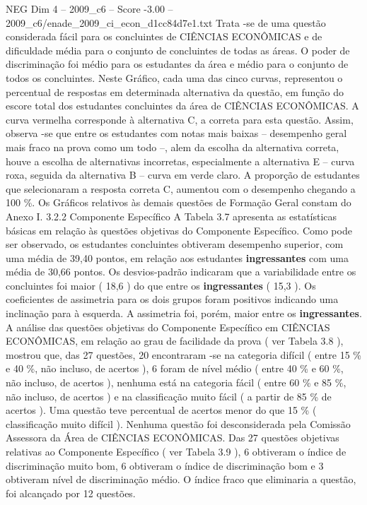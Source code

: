 \begin{textsample}{NEG Dim 4 – 2009\_c6 – Score -3.00 – 2009\_c6/enade\_2009\_ci\_econ\_d1cc84d7e1.txt}
Trata -se de uma questão considerada fácil para os concluintes de CIÊNCIAS ECONÔMICAS e de dificuldade média para o conjunto de concluintes de todas as áreas.
O poder de discriminação foi médio para os estudantes da área e médio para o conjunto de todos os concluintes.
Neste Gráfico, cada uma das cinco curvas, representou o percentual de respostas em determinada alternativa da questão, em função do escore total dos estudantes concluintes da área de CIÊNCIAS ECONÔMICAS.
A curva vermelha corresponde à alternativa C, a correta para esta questão.
Assim, observa -se que entre os estudantes com notas mais baixas – desempenho geral mais fraco na prova como um todo –, alem da escolha da alternativa correta, houve a escolha de alternativas incorretas, especialmente a alternativa E – curva roxa, seguida da alternativa B – curva em verde claro.
A proporção de estudantes que selecionaram a resposta correta C, aumentou com o desempenho chegando a 100 \%.
Os Gráficos relativos às demais questões de Formação Geral constam do Anexo I. 3.2.2 Componente Específico A Tabela 3.7 apresenta as estatísticas básicas em relação às questões objetivas do Componente Específico.
Como pode ser observado, os estudantes concluintes obtiveram desempenho superior, com uma média de 39,40 pontos, em relação aos estudantes \textbf{ingressantes} com uma média de 30,66 pontos.
Os desvios-padrão indicaram que a variabilidade entre os concluintes foi maior ( 18,6 ) do que entre os \textbf{ingressantes} ( 15,3 ).
Os coeficientes de assimetria para os dois grupos foram positivos indicando uma inclinação para à esquerda.
A assimetria foi, porém, maior entre os \textbf{ingressantes}.
A análise das questões objetivas do Componente Específico em CIÊNCIAS ECONÔMICAS, em relação ao grau de facilidade da prova ( ver Tabela 3.8 ), mostrou que, das 27 questões, 20 encontraram -se na categoria difícil ( entre 15 \% e 40 \%, não incluso, de acertos ), 6 foram de nível médio ( entre 40 \% e 60 \%, não incluso, de acertos ), nenhuma está na categoria fácil ( entre 60 \% e 85 \%, não incluso, de acertos ) e na classificação muito fácil ( a partir de 85 \% de acertos ).
Uma questão teve percentual de acertos menor do que 15 \% ( classificação muito difícil ).
Nenhuma questão foi desconsiderada pela Comissão Assessora da Área de CIÊNCIAS ECONÔMICAS.
Das 27 questões objetivas relativas ao Componente Específico ( ver Tabela 3.9 ), 6 obtiveram o índice de discriminação muito bom, 6 obtiveram o índice de discriminação bom e 3 obtiveram nível de discriminação médio.
O índice fraco que eliminaria a questão, foi alcançado por 12 questões.

\end{textsample}
